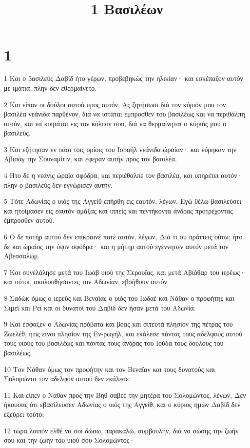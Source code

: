 

\title{1 Βασιλέων}


\chapter{1}

\par 1 Και ο βασιλεύς Δαβίδ ήτο γέρων, προβεβηκώς την ηλικίαν· και εσκέπαζον αυτόν με ιμάτια, πλην δεν εθερμαίνετο.
\par 2 Και είπον οι δούλοι αυτού προς αυτόν, Ας ζητήσωσι διά τον κύριόν μου τον βασιλέα νεάνιδα παρθένον, διά να ίσταται έμπροσθεν του βασιλέως και να περιθάλπη αυτόν, και να κοιμάται εις τον κόλπον σου, διά να θερμαίνηται ο κύριός μου ο βασιλεύς.
\par 3 Και εζήτησαν εν πάσι τοις ορίοις του Ισραήλ νεάνιδα ώραίαν· και εύρηκαν την Αβισάγ την Σουναμίτιν, και έφεραν αυτήν προς τον βασιλέα.
\par 4 Ήτο δε η νεάνις ώραία σφόδρα, και περιέθαλπε τον βασιλέα, και υπηρέτει αυτόν· πλην ο βασιλεύς δεν εγνώρισεν αυτήν.
\par 5 Τότε Αδωνίας ο υιός της Αγγείθ επήρθη εις εαυτόν, λέγων, Εγώ θέλω βασιλεύσει και ητοίμασεν εις εαυτόν αμάξας και ιππείς και πεντήκοντα άνδρας προτρέχοντας έμπροσθεν αυτού.
\par 6 Ο δε πατήρ αυτού δεν επίκραινέ ποτέ αυτόν, λέγων, Διά τι συ πράττεις ούτω; ήτο δε και ώραίος την όψιν σφόδρα· και η μήτηρ αυτού εγέννησεν αυτόν μετά τον Αβεσσαλώμ.
\par 7 Και συνελάλησε μετά του Ιωάβ υιού της Σερουΐας, και μετά Αβιάθαρ του ιερέως· και ούτοι, ακολουθήσαντες τον Αδωνίαν, εβοήθουν αυτόν.
\par 8 Σαδώκ όμως ο ιερεύς και Βεναΐας ο υιός του Ιωδαέ και Νάθαν ο προφήτης και Σιμεΐ και Ρεΐ και οι δυνατοί του Δαβίδ δεν ήσαν μετά του Αδωνία.
\par 9 Και έσφαξεν ο Αδωνίας πρόβατα και βόας και σιτευτά πλησίον της πέτρας του Ζωελέθ, ήτις είναι πλησίον της Εν-ρωγήλ, και εκάλεσε πάντας τους αδελφούς αυτού τους υιούς του βασιλέως και πάντας τους άνδρας του Ιούδα τους δούλους του βασιλέως.
\par 10 Τον Νάθαν όμως τον προφήτην και τον Βεναΐαν και τους δυνατούς και Σολομώντα τον αδελφόν αυτού δεν εκάλεσε.
\par 11 Και είπεν ο Νάθαν προς την Βηθ-σαβεέ την μητέρα του Σολομώντος, λέγων, Δεν ήκουσας ότι εβασίλευσεν Αδωνίας ο υιός της Αγγείθ, και ο κύριος ημών Δαβίδ δεν εξεύρει τούτο;
\par 12 τώρα λοιπόν ελθέ να σοι δώσω, παρακαλώ, συμβουλήν, διά να σώσης την ζωήν σου και την ζωήν του υιού σου Σολομώντος·
